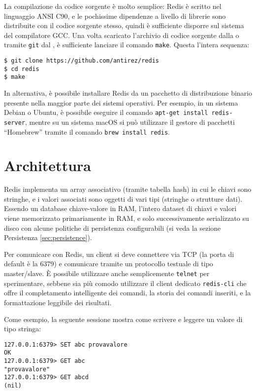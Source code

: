 La compilazione da codice sorgente è molto semplice: Redis è scritto nel linguaggio
ANSI C90, e le pochissime dipendenze a livello di librerie sono distribuite con il
codice sorgente stesso, quindi è sufficiente disporre sul sistema del compilatore GCC.
Una volta scaricato l'archivio di codice sorgente dalla \cite{pagina di scaricamento ufficiale}
o tramite \verb|git| dal \cite{repositorio ufficiale su GitHub}, è sufficiente lanciare il
comando \verb|make|. Questa l'intera sequenza:

\medskip
\begin{lstlisting}
$ git clone https://github.com/antirez/redis
$ cd redis
$ make
\end{lstlisting}

In alternativa, è possibile installare Redis da un pacchetto di distribuzione binario
presente nella maggior parte dei sistemi operativi. Per esempio, in un sistema Debian
o Ubuntu, è possibile eseguire il comando \verb|apt-get install redis-server|, mentre
su un sistema macOS si può utilizzare il gestore di pacchetti ``Homebrew'' tramite il
comando \verb|brew install redis|.

\section{Architettura}

Redis implementa un array associativo (tramite tabella hash) in cui le chiavi sono stringhe, e i
valori associati sono oggetti di vari tipi (stringhe o strutture dati). Essendo un database
chiave-valore in RAM, l'intero dataset di chiavi e valori viene memorizzato primariamente in RAM, e
solo successivamente serializzato su disco con alcune politiche di persistenza configurabili (si
veda la sezione Persistenza \ref{sec:persistence}).

Per comunicare con Redis, un client si deve connettere via TCP (la porta di default è la 6379) e
comunicare tramite un protocollo testuale di tipo master/slave. È possibile utilizzare
anche semplicemente \verb|telnet| per sperimentare, sebbene sia più comodo utilizzare il
client dedicato \verb|redis-cli| che offre il completamento intelligente dei comandi, la
storia dei comandi inseriti, e la formattazione leggibile dei risultati.

Come esempio, la seguente sessione mostra come scrivere e leggere un valore di tipo
stringa:

\medskip
\begin{lstlisting}
127.0.0.1:6379> SET abc provavalore
OK
127.0.0.1:6379> GET abc
"provavalore"
127.0.0.1:6379> GET abcd
(nil)
\end{lstlisting}

